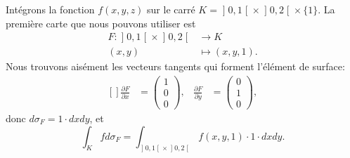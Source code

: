 Intégrons la fonction $f(x,y,z)$ sur le carré $K=\mathopen] 0 , 1 \mathclose[\times \mathopen] 0 , 2 \mathclose[\times\{ 1 \}$. La première carte que nous pouvons utiliser est
\begin{equation}
	\begin{aligned}
		F\colon \mathopen] 0 , 1 \mathclose[\times\mathopen] 0 , 2 \mathclose[&\to K \\
		(x,y)&\mapsto (x,y,1).
	\end{aligned}
\end{equation}
Nous trouvons aisément les vecteurs tangents qui forment l'élément de surface:
\begin{equation}
	\begin{aligned}[]
		\frac{ \partial F }{ \partial x }&=\begin{pmatrix}
			1	\\
			0	\\
			0
		\end{pmatrix},
		&\frac{ \partial F }{ \partial y }&=\begin{pmatrix}
			0	\\
			1	\\
			0
		\end{pmatrix},
	\end{aligned}
\end{equation}
donc $d\sigma_F=1\cdot dxdy$, et
\begin{equation}		\label{IntKSurcarrUn}
	\int_Kfd\sigma_F=\int_{\mathopen] 0 , 1 \mathclose[\times\mathopen] 0 , 2 \mathclose[}f(x,y,1)\cdot 1\cdot dxdy.
\end{equation}

